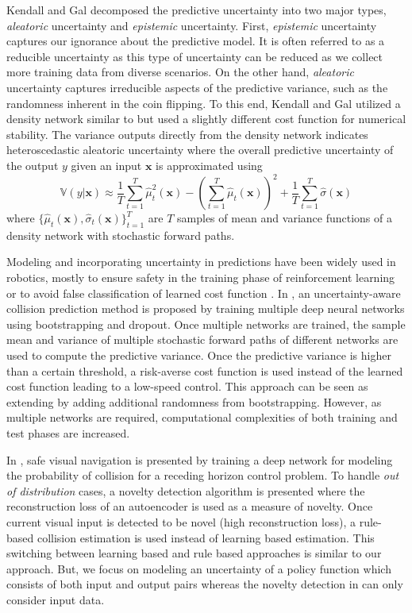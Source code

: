 \documentclass[letterpaper, 10 pt, conference]{ieeeconf}  %
\def\Bx{\mathbf{x}} \def\By{\mathbf{y}} \def\Bp{\mathbf{p}}
\begin{document}
Kendall and Gal \cite{Kendall_17} decomposed the
predictive uncertainty into two major types,
\textit{aleatoric} uncertainty and \textit{epistemic} uncertainty. 
First, \textit{epistemic} uncertainty captures 
our ignorance about the predictive model.
It is often referred to as a reducible uncertainty as this type of uncertainty
can be reduced as we collect more training data 
from diverse scenarios.
On the other hand, \textit{aleatoric} uncertainty captures 
irreducible aspects of the predictive variance, such as 
the randomness inherent in the coin flipping. 
To this end, Kendall and Gal utilized a density network similar to 
\cite{Lakshminarayanan_16} but used a slightly different 
cost function for numerical stability. 
The variance outputs directly from the density network
indicates heteroscedastic aleatoric uncertainty where the
overall predictive uncertainty of the output $y$
given an input $\Bx$ is approximated using
\begin{equation} \label{eqn:kendall}
	\mathbb{V}(y|\Bx) \approx \frac{1}{T}
		\sum_{t=1}^{T} \hat{\mu}^2_t(\Bx)
		-\left( 
			\sum_{t=1}^{T} \hat{\mu}_t(\Bx)
		\right)^2
		+\frac{1}{T}\sum_{t=1}^T \hat{\sigma}(\Bx)
\end{equation}
where $\{ \hat{\mu}_t(\Bx), \hat{\sigma}_t(\Bx) \}_{t=1}^T$
are $T$ samples of 
mean and variance functions of a density network
with stochastic forward paths. 


Modeling and incorporating uncertainty in predictions
have been widely used in robotics,
mostly to ensure safety 
in the training phase of reinforcement learning
\cite{Kahn_17} 
or to avoid false classification of learned cost function
\cite{Richter_17}.
In \cite{Kahn_17}, an uncertainty-aware collision prediction method
is proposed
by training multiple deep neural networks using bootstrapping and dropout.
Once multiple networks are trained, the sample mean and variance 
of multiple stochastic forward paths of different networks are used
to compute the predictive variance.
Once the predictive variance is higher than a certain threshold, 
a risk-averse cost function is used instead of 
the learned cost function
leading to a low-speed control.
This approach can be seen as extending \cite{Gal_16} by adding 
additional randomness from bootstrapping. 
However, as multiple networks are required,
computational complexities of both training and test phases
are increased. 

In \cite{Richter_17}, safe visual navigation is presented
by training a deep network for modeling 
the probability of collision for a receding horizon control problem.
To handle \textit{out of distribution} cases, a novelty detection
algorithm is presented where the reconstruction loss of
an autoencoder is used as a measure of novelty.
Once current visual input is detected to be novel (high reconstruction loss), 
a rule-based collision estimation is used 
instead of learning based estimation.
This switching between learning based and rule based approaches
is similar to our approach. 
But, we focus on modeling an uncertainty of 
a policy function which consists of both input and output pairs 
whereas the novelty detection in \cite{Richter_17} 
can only consider input data. 
\end{document}
